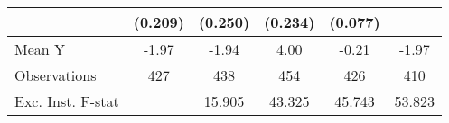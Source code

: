 {\begin{tabular}{l*{5}{c}}
            &     (0.209)         &     (0.250)         &     (0.234)         &     (0.077)         &                     \\
\midrule
Mean Y      &       -1.97         &       -1.94         &        4.00         &       -0.21         &       -1.97         \\
Observations&         427         &         438         &         454         &         426         &         410         \\
Exc. Inst. F-stat&                     &      15.905         &      43.325         &      45.743         &      53.823         \\
\bottomrule
\end{tabular}
}
